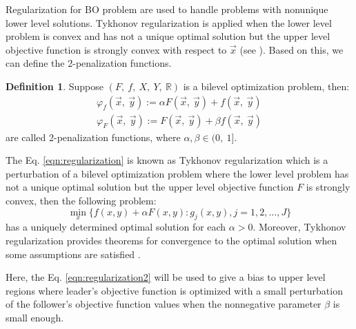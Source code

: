 \documentclass[conference]{IEEEtran}
\theoremstyle{definition}
\newtheorem{definition}{Definition}[section]
\begin{document}
Regularization for BO problem are used to handle problems with nonunique lower
level solutions.  Tykhonov regularization is applied when the lower level problem
is convex and has not a unique optimal solution but the upper level objective function
is strongly convex with respect to $\vec{x}$ (see \cite{dempe2002foundations}).
Based on this, we can define the 2-penalization functions.

\begin{definition}
    Suppose $(F, \ f, \ X, \ Y, \ \mathbb{R} )$ is a bilevel optimization problem,
    then:
    \begin{align}
        \label{eqn:regularization}
        \varphi_f (\vec{x},\ \vec{y}) := \alpha F(\vec{x},\ \vec{y}) +  f(\vec{x},\ \vec{y}) \\
        \label{eqn:regularization2}
        \varphi_F (\vec{x},\ \vec{y}) := F(\vec{x},\ \vec{y}) +  \beta f(\vec{x},\ \vec{y})
    \end{align}
    are called 2-penalization functions, where $\alpha, \beta \in (0,\ 1]$.
\end{definition}
% 
The Eq. \ref{eqn:regularization} is known as Tykhonov regularization which is a
perturbation of a bilevel optimization problem where the lower level problem has
not a unique optimal solution but the upper level objective function $F$ is 
strongly convex, then the following problem:
\begin{equation}
	\min_x \{ f(x,y) + \alpha F(x, y) : g_j(x, y), j=1,2,\ldots, J\} 
	\label{eqn:relaxed}
\end{equation}
% 
has a uniquely determined optimal solution for each $\alpha > 0$. 
Moreover, Tykhonov regularization provides theorems for convergence to the optimal
solution when some assumptions are satisfied \cite{dempe2002foundations}. 

Here, the Eq. \ref{eqn:regularization2} will be used to give a bias to upper level
regions where leader's objective function is optimized with a small perturbation
of the follower's objective function values when the nonnegative parameter $\beta$
is small enough. 
\end{document}
